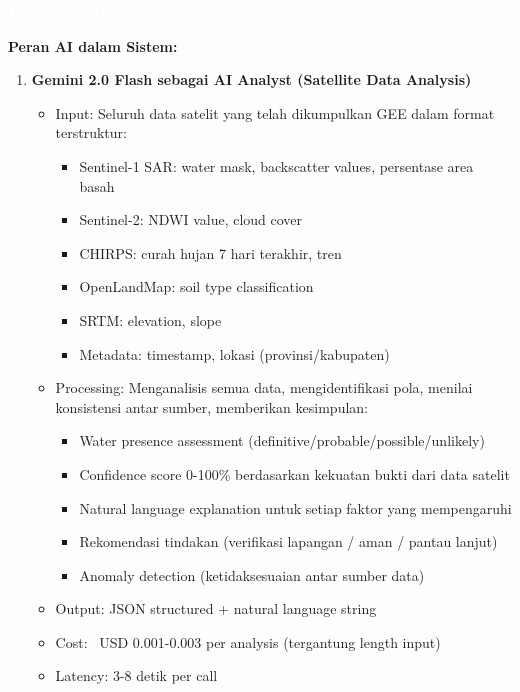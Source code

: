 \documentclass[12pt,a4paper]{article}
\newcommand{\sectionbox}[1]{%
  \colorbox{samsungblue}{%
    \parbox{\textwidth}{%
      \textcolor{white}{\large\bfseries #1}%
    }%
  }%
}
\newcommand{\subsectionbox}[1]{%
  \textbf{\large #1}\\[0.3cm]
}
\begin{document}
\vspace{1cm}

\sectionbox{10. KONTRIBUSI AI}

\vspace{0.5cm}

\subsectionbox{Peran AI dalam Sistem:}

\begin{enumerate}
  \item \textbf{Gemini 2.0 Flash sebagai AI Analyst (Satellite Data Analysis)}
  \begin{itemize}
    \item Input: Seluruh data satelit yang telah dikumpulkan GEE dalam format terstruktur:
    \begin{itemize}
      \item Sentinel-1 SAR: water mask, backscatter values, persentase area basah
      \item Sentinel-2: NDWI value, cloud cover
      \item CHIRPS: curah hujan 7 hari terakhir, tren
      \item OpenLandMap: soil type classification
      \item SRTM: elevation, slope
      \item Metadata: timestamp, lokasi (provinsi/kabupaten)
    \end{itemize}
    \item Processing: Menganalisis semua data, mengidentifikasi pola, menilai konsistensi antar sumber, memberikan kesimpulan:
    \begin{itemize}
      \item Water presence assessment (definitive/probable/possible/unlikely)
      \item Confidence score 0-100\% berdasarkan kekuatan bukti dari data satelit
      \item Natural language explanation untuk setiap faktor yang mempengaruhi
      \item Rekomendasi tindakan (verifikasi lapangan / aman / pantau lanjut)
      \item Anomaly detection (ketidaksesuaian antar sumber data)
    \end{itemize}
    \item Output: JSON structured + natural language string
    \item Cost: ~USD 0.001-0.003 per analysis (tergantung length input)
    \item Latency: 3-8 detik per call
  \end{itemize}
\end{enumerate}
\end{document}

